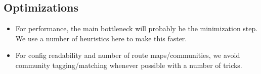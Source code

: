 \subsection{Optimizations}

\begin{itemize}
	\item For performance, the main bottleneck will probably be the minimization step. We use a number of heuristics here to make this faster.
	\item For config readability and number of route maps/communities, we avoid community tagging/matching whenever possible with a number of tricks.
\end{itemize}



